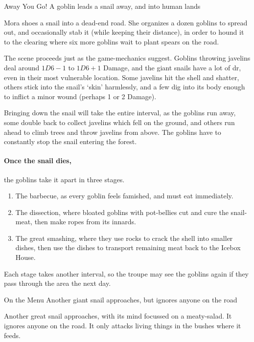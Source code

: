 {Away You Go!}%
{A goblin leads a snail away, and into human lands}%

Mora shoes a snail into a dead-end road.
She organizes a dozen goblins to spread out, and occasionally stab it (while keeping their distance), in order to hound it to the clearing where six more goblins wait to plant spears on the road.

The scene proceeds just as the game-mechanics suggest.
Goblins throwing javelins deal around $1D6-1$ to $1D6+1$ Damage, and the giant snails have a lot of \gls{dr}, even in their most vulnerable location.
Some javelins hit the shell and shatter, others stick into the snail's `skin' harmlessly, and a few dig into its body enough to inflict a minor wound (perhaps 1 or 2 Damage).

Bringing down the snail will take the entire \gls{interval}, as the goblins run away, some double back to collect javelins which fell on the ground, and others run ahead to climb trees and throw javelins from above.
The goblins have to constantly stop the snail entering the forest.

\paragraph{Once the snail dies,}
the goblins take it apart in three stages.

\begin{enumerate}
  \item
  The barbecue, as every goblin feels famished, and must eat immediately.
  \item
  The dissection, where bloated goblins with pot-bellies cut and cure the snail-meat, then make ropes from its innards.
  \item
  The great smashing, where they use rocks to crack the shell into smaller dishes, then use the dishes to transport remaining meat back to the Icebox House.
\end{enumerate}

Each stage takes another \gls{interval}, so the troupe may see the goblins again if they pass through the area the next day.

{On the Menu}%
{Another giant snail approaches, but ignores anyone on the road}%

Another great snail approaches, with its mind focussed on a meaty-salad.
It ignores anyone on the road.
It only attacks living things in the bushes where it feeds.

